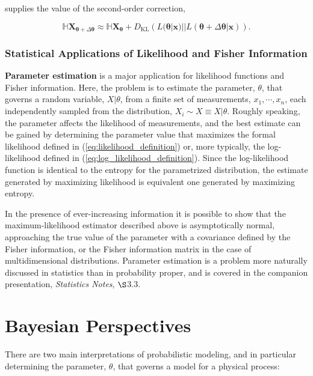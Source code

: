 \documentclass[12pt, twoside, draft]{article}
\begin{document}
supplies the value of the second-order correction,

\begin{equation}
\mathbb{H} \mathbf{X}_{\boldsymbol{\theta} + \Delta \boldsymbol{\theta}} \approx \mathbb{H} \mathbf{X}_{\boldsymbol{\theta}} + D_{\text{KL}} \left( L(\boldsymbol{\theta} | \mathbf{x}) || L(\boldsymbol{\theta} + \Delta \boldsymbol{\theta} | \mathbf{x}) \right).
\end{equation}

\subsubsection{Statistical Applications of Likelihood and Fisher Information}\label{sec:statistical_applications_likelihood_Fisher_information}
\textbf{Parameter estimation} is a major application for likelihood functions and Fisher information.  Here, the problem is to estimate the parameter, $\theta$, that governs a random variable, $X | \theta$, from a finite set of measurements, $x_1, \cdots, x_n$, each independently sampled from the distribution, $X_i \sim X \equiv X | \theta$.  Roughly speaking, the parameter affects the likelihood of measurements, and the best estimate can be gained by determining the parameter value that maximizes the formal likelihood defined in (\ref{eq:likelihood_definition}) or, more typically, the log-likelihood defined in (\ref{eq:log_likelihood_definition}).  Since the log-likelihood function is identical to the entropy for the parametrized distribution, the estimate generated by maximizing likelihood is equivalent one generated by maximizing entropy.

In the presence of ever-increasing information it is possible to show that the maximum-likelihood estimator described above is asymptotically normal, approaching the true value of the parameter with a covariance defined by the Fisher information, or the Fisher information matrix in the case of multidimensional distributions.  Parameter estimation is a problem more naturally discussed in statistics than in probability proper, and is covered in the companion presentation, \textit{Statistics Notes}, $\S$3.3.

\section{Bayesian Perspectives}\label{sec:Bayesian_perspectives}
There are two main interpretations of probabilistic modeling, and in particular determining the parameter, $\theta$, that governs a model for a physical process:
\end{document}
